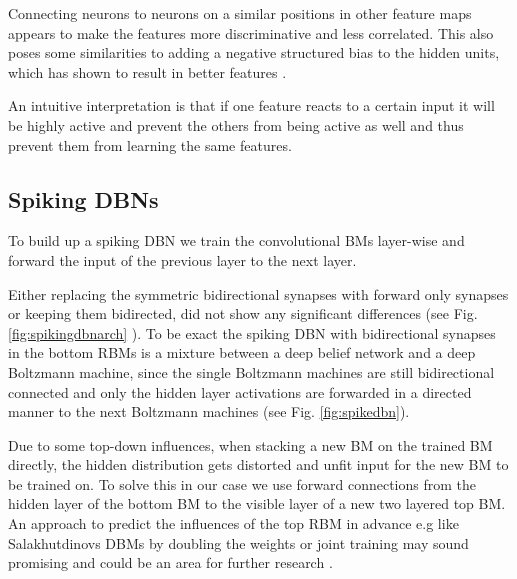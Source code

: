 Connecting neurons to neurons on a similar positions in other feature maps appears to make the features more discriminative and less correlated.
This also poses some similarities to adding a negative structured bias to the hidden units, which has shown to result in better features \cite{DBLP:journals/corr/KheradpishehGTM16}\cite{LeCun}\cite{NorouziM2009}.

An intuitive interpretation is that if one feature reacts to a certain input it will be highly active and prevent the others from being active as well and thus prevent them from learning the same features.  

\subsection{Spiking DBNs} \label{c:spikingdbn}

To build up a spiking DBN we train the convolutional BMs layer-wise and forward the input of the previous layer to the next layer.

Either replacing the symmetric bidirectional synapses with forward only synapses or keeping them bidirected, did not show any significant differences (see Fig. \ref{fig:spikingdbnarch} ). 
To be exact the spiking DBN with bidirectional synapses in the bottom RBMs is a mixture between a deep belief network and a deep Boltzmann machine, since the single Boltzmann machines are still bidirectional connected and only the hidden layer activations are forwarded in a directed manner to the next Boltzmann machines (see Fig. \ref{fig:spikedbn}).

Due to some top-down influences, when stacking a new BM  on the trained BM directly, the hidden distribution gets distorted and unfit input for the new BM to be trained on. 
To solve this in our case we use forward connections from the hidden layer of the bottom BM to the visible layer of a new two layered top BM. 
An approach to predict the influences of the top RBM in advance e.g like Salakhutdinovs DBMs by doubling the weights or joint training may sound promising and could be an area for further research \cite{salakhutdinov2009deep}.

